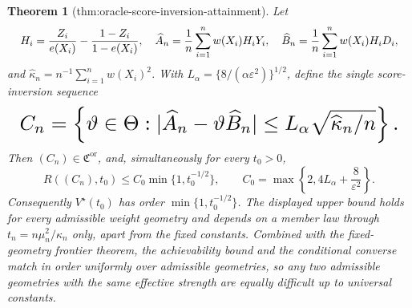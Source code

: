 \documentclass{article}
\newtheorem{theorem}{Theorem}
\begin{document}
\begin{theorem}[thm:oracle-score-inversion-attainment]\label{thm:oracle-score-inversion-attainment}
Let
\[
\makebox[\linewidth][c]{\resizebox{0.98\linewidth}{!}{\(\displaystyle H_i=\frac{Z_i}{e(X_i)}-\frac{1-Z_i}{1-e(X_i)},\quad
 \widehat A_n=\frac1n\sum_{i=1}^nw(X_i)H_iY_i,\quad
 \widehat B_n=\frac1n\sum_{i=1}^nw(X_i)H_iD_i,\)}}
\]
and \(\widehat\kappa_n=n^{-1}\sum_{i=1}^nw(X_i)^2\).  With \(L_\alpha=\{8/(\alpha\varepsilon^2)\}^{1/2}\), define the single score-inversion sequence
\[
\makebox[\linewidth][c]{\resizebox{0.98\linewidth}{!}{\(\displaystyle C_n=\left\{\vartheta\in\Theta:
 |\widehat A_n-\vartheta\widehat B_n|
 \le L_\alpha\sqrt{\widehat\kappa_n/n}\right\}.\)}}
\]
Then \((C_n)\in\mathfrak C^{\mathrm{or}}\), and, simultaneously for every \(t_0>0\),
\[
 R((C_n),t_0)\le C_0\min\{1,t_0^{-1/2}\},
 \qquad
 C_0=\max\left\{2,4L_\alpha+\frac8{\varepsilon^2}\right\}.
\]
Consequently \(V^\star(t_0)\) has order \(\min\{1,t_0^{-1/2}\}\).  The displayed upper bound holds for every admissible weight geometry and depends on a member law through \(t_n=n\mu_n^2/\kappa_n\) only, apart from the fixed constants.  Combined with the fixed-geometry frontier theorem, the achievability bound and the conditional converse match in order uniformly over admissible geometries, so any two admissible geometries with the same effective strength are equally difficult up to universal constants.
\end{theorem}
\end{document}
